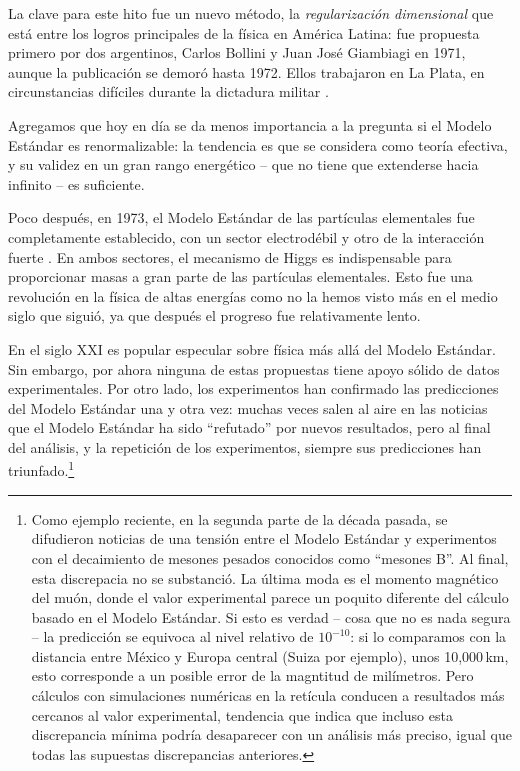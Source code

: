 La clave para este hito fue un nuevo m\'etodo, la {\em regularizaci\'on
dimensional} que est\'a entre los logros principales de la f\'isica en
Am\'erica Latina: fue propuesta primero por dos argentinos, Carlos Bollini
y Juan Jos\'e Giambiagi en 1971, aunque la publicaci\'on \cite{BolGiam}
se demor\'o hasta 1972. Ellos trabajaron en La Plata, en
circunstancias dif\'iciles durante la dictadura militar \cite{DimReg}.

Agregamos que hoy en d\'ia se da menos importancia a la pregunta
si el Modelo Est\'andar es renormalizable: la tendencia es que se
considera como teor\'ia efectiva, y su validez en un gran rango
energ\'etico -- que no tiene que extenderse hacia infinito --
es suficiente.

Poco despu\'es, en 1973, el Modelo Est\'andar de las part\'iculas
elementales fue completamente establecido, con un sector
electrod\'ebil \cite{Weinberg,Salam} y otro de la interacci\'on
fuerte \cite{QCD}. En ambos sectores,
el mecanismo de Higgs es indispensable para proporcionar masas
a gran parte de las part\'iculas elementales.
Esto fue una revoluci\'on en la f\'isica de altas energ\'ias como no la
hemos visto m\'as en el medio siglo que sigui\'o, ya que despu\'es el
progreso fue relativamente lento.




En el siglo XXI es popular especular sobre f\'isica m\'as all\'a
del Modelo Est\'andar. Sin embargo, por ahora ninguna de estas propuestas
tiene apoyo s\'olido de datos experimentales. Por otro lado, los
experimentos han confirmado las predicciones del Modelo Est\'andar una
y otra vez: muchas veces salen al aire en las noticias que el
Modelo Est\'andar ha sido ``refutado''
por nuevos resultados, pero al final del an\'alisis, y la repetici\'on
de los experimentos, siempre sus predicciones han
triunfado.\footnote{Como ejemplo reciente, en la segunda parte de la
  d\'ecada pasada, se difudieron noticias de una tensi\'on entre el Modelo
  Est\'andar y experimentos con el decaimiento de mesones pesados
  conocidos como ``mesones B''. Al final, esta discrepacia no se
  substanci\'o. La \'ultima moda es el momento magn\'etico del
  mu\'on, donde el valor experimental parece un poquito diferente
  del c\'alculo basado en el Modelo Est\'andar. Si esto es verdad --
  cosa que no es nada segura -- la predicci\'on se equivoca al
  nivel relativo de $10^{-10}$: si lo comparamos con la distancia
  entre M\'exico y Europa central (Suiza por ejemplo), unos
  10,000\,km, esto corresponde a un posible error de la magntitud
  de mil\'imetros. Pero c\'alculos con simulaciones num\'ericas
  en la ret\'icula conducen a resultados m\'as cercanos al valor
  experimental, tendencia que indica que incluso esta discrepancia
  m\'inima podr\'ia desaparecer con un an\'alisis m\'as preciso,
  igual que todas las supuestas discrepancias anteriores.}
  
